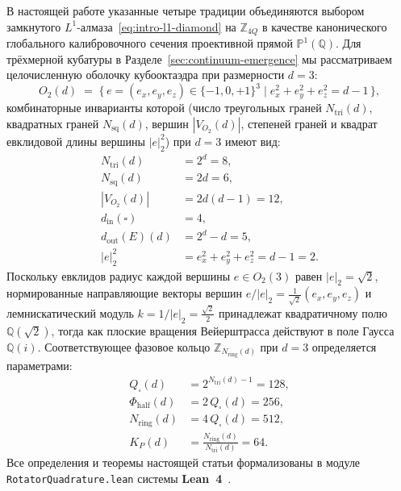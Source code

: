 \documentclass[11pt,a4paper]{article}
\theoremstyle{plain}
\theoremstyle{definition}
\begin{document}
В настоящей работе указанные четыре традиции объединяются выбором замкнутого $L^1$-алмаза~\eqref{eq:intro-l1-diamond} на $\mathbb{Z}_{4Q}$ в качестве канонического глобального калибровочного сечения проективной прямой $\mathbb{P}^1(\mathbb{Q})$. Для трёхмерной кубатуры в Разделе~\ref{sec:continuum-emergence} мы рассматриваем целочисленную оболочку кубооктаэдра при размерности $d = 3$:
\begin{equation}
  \label{eq:cuboct-shell-def}
  O_2(d) \;=\; \bigl\{\,e = (e_x, e_y, e_z) \in \{-1, 0, +1\}^3 \;\big|\; e_x^2 + e_y^2 + e_z^2 = d - 1\,\bigr\},
\end{equation}
комбинаторные инварианты которой (число треугольных граней $N_{\mathrm{tri}}(d)$, квадратных граней $N_{\mathrm{sq}}(d)$, вершин $|V_{O_2}(d)|$, степеней граней и квадрат евклидовой длины вершины $|e|_2^2$) при $d = 3$ имеют вид:
\begin{align}
  N_{\mathrm{tri}}(d) &= 2^d = 8, \label{eq:cuboct-triangles} \\
  N_{\mathrm{sq}}(d) &= 2d = 6, \label{eq:cuboct-squares} \\
  |V_{O_2}(d)| &= 2d(d-1) = 12, \label{eq:cuboct-vertices} \\
  d_{\mathrm{in}}(\square) &= 4, \label{eq:cuboct-din} \\
  d_{\mathrm{out}}(E)(d) &= 2^d - d = 5, \label{eq:cuboct-dout} \\
  |e|_2^2 &= e_x^2 + e_y^2 + e_z^2 = d - 1 = 2. \label{eq:cuboct-norm2}
\end{align}
Поскольку евклидов радиус каждой вершины $e \in O_2(3)$ равен $|e|_2 = \sqrt{2}$, нормированные направляющие векторы вершин $e / |e|_2 = \frac{1}{\sqrt{2}}(e_x, e_y, e_z)$ и лемнискатический модуль $k = 1/|e|_2 = \frac{\sqrt{2}}{2}$ принадлежат квадратичному полю $\mathbb{Q}(\sqrt{2})$, тогда как плоские вращения Вейерштрасса действуют в поле Гаусса $\mathbb{Q}(i)$. Соответствующее фазовое кольцо $\mathbb{Z}_{N_{\mathrm{ring}}(d)}$ при $d = 3$ определяется параметрами:
\begin{align}
  Q_\square(d) &= 2^{N_{\mathrm{tri}}(d) - 1} = 128, \label{eq:ring-quarter} \\
  \Phi_{\mathrm{half}}(d) &= 2\,Q_\square(d) = 256, \label{eq:ring-half} \\
  N_{\mathrm{ring}}(d) &= 4\,Q_\square(d) = 512, \label{eq:ring-full} \\
  K_P(d) &= \frac{N_{\mathrm{ring}}(d)}{N_{\mathrm{tri}}(d)} = 64. \label{eq:ring-bisector}
\end{align}
Все определения и теоремы настоящей статьи формализованы в модуле \texttt{RotatorQuadrature.lean} системы \textbf{Lean~4}~\cite{Moura2021}.
\end{document}
